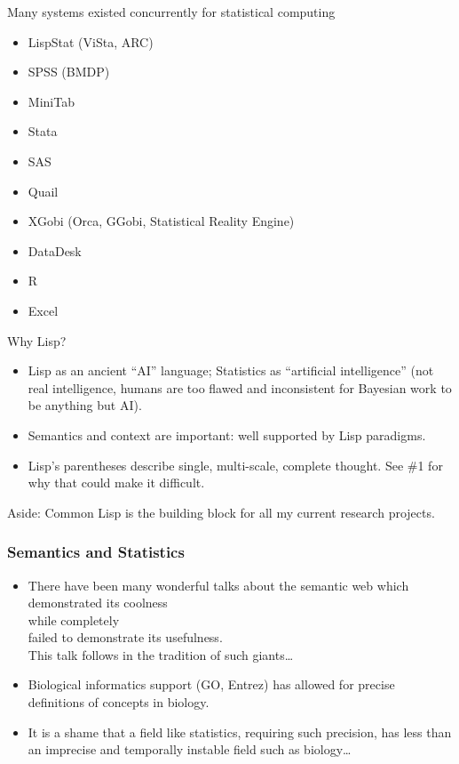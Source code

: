 \documentclass{beamer}
\begin{document}
\begin{frame}{Many systems existed concurrently for statistical
    computing}

  \begin{itemize}
  \item LispStat (ViSta, ARC)
  \item SPSS (BMDP)
  \item MiniTab
  \item Stata
  \item SAS
  \item Quail
  \item XGobi (Orca, GGobi, Statistical Reality Engine)
  \item DataDesk
  \item R
  \item Excel
  \end{itemize}
\end{frame}

\begin{frame}{Why Lisp?}
  \begin{itemize}
  \item Lisp as an ancient ``AI'' language; Statistics as ``artificial
    intelligence'' (not real intelligence, \alert{humans are too
      flawed and inconsistent} for Bayesian work to be anything but
    AI).
  \item Semantics and context are important: well supported by Lisp
    paradigms.
  \item Lisp's parentheses describe single, multi-scale,
    \alert{complete thought}.  See \#1 for why that could make it
    difficult.
  \end{itemize}
  Aside: Common Lisp is the building block for all my current research
  projects.
\end{frame}

\begin{frame}
  \frametitle{Semantics and Statistics}
  \begin{itemize}
  \item
    There have been many wonderful talks about the semantic web which \\
    \alert{demonstrated its coolness} \\
    while completely \\
    \alert{failed to demonstrate its usefulness}.\\
    This talk follows in the tradition of such giants\ldots{}
    
  \item 
    Biological informatics support (GO, Entrez) has allowed for
    precise definitions of concepts in biology.

  \item It is a shame that a field like statistics, requiring such
    precision, has less than an imprecise and temporally instable
    field such as biology\ldots
  \end{itemize}
\end{frame}
\end{document}
